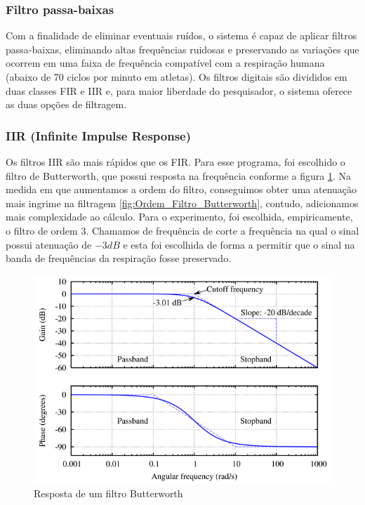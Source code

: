 \subsubsection{Filtro passa-baixas}

Com a finalidade de eliminar eventuais ruídos, o sistema é capaz de aplicar filtros passa-baixas, eliminando altas frequências ruidosas e preservando as variações que ocorrem em uma faixa de frequência compatível com a respiração humana (abaixo de 70 ciclos por minuto em atletas). Os filtros digitais são divididos em duas classes FIR e IIR e, para maior liberdade do pesquisador, o sistema oferece as duas opções de filtragem.

\subsubsection{IIR (Infinite Impulse Response)}

Os filtros IIR são mais rápidos que os FIR. Para esse programa, foi escolhido o filtro de Butterworth, que possui resposta na frequência conforme a figura \ref{fig:Filtro_Butterworth}. Na medida em que aumentamos a ordem do filtro, conseguimos obter uma atenuação mais ingrime na filtragem \ref{fig:Ordem_Filtro_Butterworth}, contudo, adicionamos mais complexidade ao cálculo. Para o experimento, foi escolhida, empiricamente, o filtro de ordem 3. Chamamos de frequência de corte a frequência na qual o sinal possui atenuação de $-3 dB$ e esta foi escolhida de forma a permitir que o sinal na banda de frequências da respiração fosse preservado.

\begin{figure}[h!]
	\begin{center}
		\includegraphics[width=0.7\linewidth]{images/Butterworth_filter_bode_plot.png}
		\caption{Resposta de um filtro Butterworth}
		\label{fig:Filtro_Butterworth}
	\end{center}
\end{figure}

